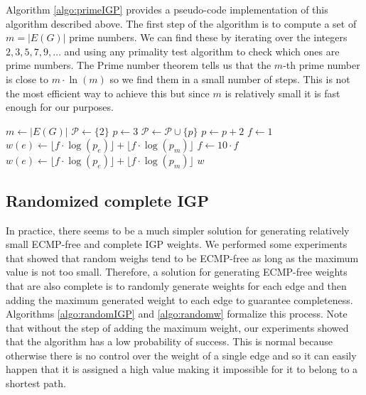 Algorithm \ref{algo:primeIGP} provides a pseudo-code implementation of this algorithm described above.
The first step of the algorithm is to compute a set of $m = |E(G)|$ prime numbers. We can find these by iterating over the integers $2, 3, 5, 7, 9, \ldots$
and using any primality test algorithm to check which ones are prime numbers. The Prime number theorem \cite{Cormen:2009:IAT:1614191} %
tells us that the $m$-th prime number is close to $m \cdot \ln(m)$ so we find them in a small number of steps.
This is not the most efficient way to achieve this but since $m$ is relatively small it is fast enough for our purposes.

\begin{algorithm}[t]
\small
\caption{$\textsf{primeIGP}\left( G \right)$}
\begin{algorithmic}[1]
{}
\STATE $m \gets |E(G)|$
\STATE $\mathcal{P} \gets \{ 2 \}$
\STATE $p \gets 3$
    \STATE $\mathcal{P} \gets \mathcal{P} \cup \{p\}$
  \ENDIF
  \STATE $p \gets p + 2$
\ENDWHILE
{}
\STATE $f \gets 1$
  \STATE $w(e) \gets \lfloor f \cdot \log(p_e) \rfloor + \lfloor f \cdot \log(p_m) \rfloor$
\ENDFOR
{}
  \STATE $f \gets 10 \cdot f$
    \STATE $w(e) \gets \lfloor f \cdot \log(p_e) \rfloor + \lfloor f \cdot \log(p_m) \rfloor$
  \ENDFOR
\ENDWHILE
\RETURN $w$
\end{algorithmic}
\label{algo:primeIGP}
\end{algorithm}

\subsection{Randomized complete IGP}

In practice, there seems to be a much simpler solution for generating relatively small ECMP-free and complete IGP weights.
We performed some experiments that showed that random weighs tend to be ECMP-free as long as the maximum value is not too small.
Therefore, a solution for generating ECMP-free weights that are also complete is to randomly generate weights for each edge 
and then adding the maximum generated weight to each edge to guarantee completeness. Algorithms \ref{algo:randomIGP} and \ref{algo:randomw}
formalize this process. Note that without the step of adding the maximum weight, our experiments showed that the algorithm
has a low probability of success. This is normal because otherwise there is no control over the weight of a single edge 
and so it can easily happen that it is assigned a high value making it impossible for it to belong to a shortest path.

